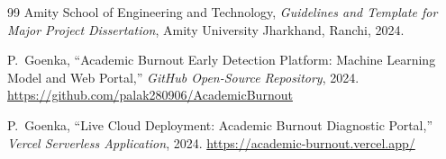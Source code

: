\documentclass[12pt,a4paper,oneside]{report}
\begin{document}
\begin{thebibliography}{99}
Amity School of Engineering and Technology,
\newblock \emph{Guidelines and Template for Major Project Dissertation},
\newblock Amity University Jharkhand, Ranchi, 2024.

P.~Goenka,
\newblock ``Academic Burnout Early Detection Platform: Machine Learning Model and Web Portal,''
\newblock \emph{GitHub Open-Source Repository}, 2024. \url{https://github.com/palak280906/AcademicBurnout}

P.~Goenka,
\newblock ``Live Cloud Deployment: Academic Burnout Diagnostic Portal,''
\newblock \emph{Vercel Serverless Application}, 2024. \url{https://academic-burnout.vercel.app/}

\end{thebibliography}
\end{document}
